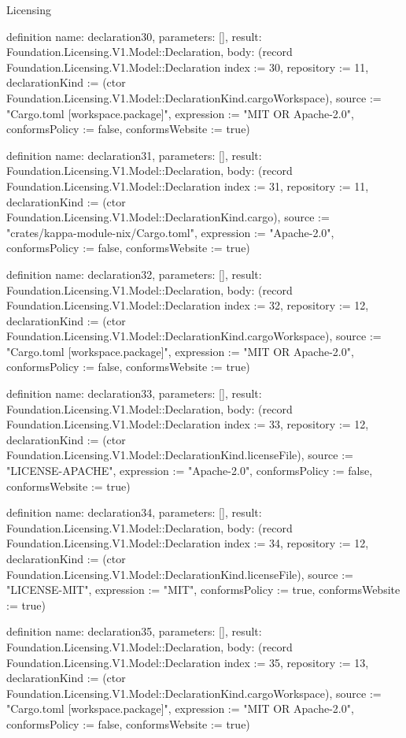\begin{lexlean}{Licensing}
\begin{semanticmodule}
definition{
  name: declaration30,
  parameters: [],
  result: Foundation.Licensing.V1.Model::Declaration,
  body: (record Foundation.Licensing.V1.Model::Declaration {index := 30, repository := 11, declarationKind := (ctor Foundation.Licensing.V1.Model::DeclarationKind.cargoWorkspace), source := "Cargo.toml [workspace.package]", expression := "MIT OR Apache-2.0", conformsPolicy := false, conformsWebsite := true})
}

definition{
  name: declaration31,
  parameters: [],
  result: Foundation.Licensing.V1.Model::Declaration,
  body: (record Foundation.Licensing.V1.Model::Declaration {index := 31, repository := 11, declarationKind := (ctor Foundation.Licensing.V1.Model::DeclarationKind.cargo), source := "crates/kappa-module-nix/Cargo.toml", expression := "Apache-2.0", conformsPolicy := false, conformsWebsite := true})
}

definition{
  name: declaration32,
  parameters: [],
  result: Foundation.Licensing.V1.Model::Declaration,
  body: (record Foundation.Licensing.V1.Model::Declaration {index := 32, repository := 12, declarationKind := (ctor Foundation.Licensing.V1.Model::DeclarationKind.cargoWorkspace), source := "Cargo.toml [workspace.package]", expression := "MIT OR Apache-2.0", conformsPolicy := false, conformsWebsite := true})
}

definition{
  name: declaration33,
  parameters: [],
  result: Foundation.Licensing.V1.Model::Declaration,
  body: (record Foundation.Licensing.V1.Model::Declaration {index := 33, repository := 12, declarationKind := (ctor Foundation.Licensing.V1.Model::DeclarationKind.licenseFile), source := "LICENSE-APACHE", expression := "Apache-2.0", conformsPolicy := false, conformsWebsite := true})
}

definition{
  name: declaration34,
  parameters: [],
  result: Foundation.Licensing.V1.Model::Declaration,
  body: (record Foundation.Licensing.V1.Model::Declaration {index := 34, repository := 12, declarationKind := (ctor Foundation.Licensing.V1.Model::DeclarationKind.licenseFile), source := "LICENSE-MIT", expression := "MIT", conformsPolicy := true, conformsWebsite := true})
}

definition{
  name: declaration35,
  parameters: [],
  result: Foundation.Licensing.V1.Model::Declaration,
  body: (record Foundation.Licensing.V1.Model::Declaration {index := 35, repository := 13, declarationKind := (ctor Foundation.Licensing.V1.Model::DeclarationKind.cargoWorkspace), source := "Cargo.toml [workspace.package]", expression := "MIT OR Apache-2.0", conformsPolicy := false, conformsWebsite := true})
}


\end{semanticmodule}
\end{lexlean}
